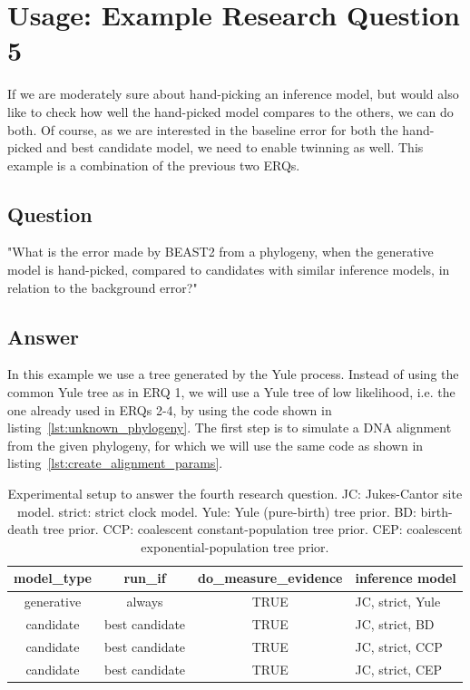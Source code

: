 \section{Usage: Example Research Question 5}

If we are moderately sure about hand-picking an inference model,
but would also like to check how well the hand-picked model compares
to the others, we can do both. Of course, as we are interested in the
baseline error for both the hand-picked and best candidate model,
we need to enable twinning as well. This example is a combination
of the previous two ERQs. 

\subsection{Question}

"What is the error made by BEAST2 from a phylogeny, 
when the generative model is hand-picked, 
compared to candidates with similar inference models, 
in relation to the background error?"

\subsection{Answer}

In this example we use a tree generated by the Yule process.
Instead of using the common Yule tree as in ERQ 1, we will use
a Yule tree of low likelihood, 
i.e. the one already used in ERQs 2-4, 
by using the code shown in listing~\ref{lst:unknown_phylogeny}.
The first step is to simulate a DNA alignment 
from the given phylogeny, for which we will use the same code 
as shown in listing~\ref{lst:create_alignment_params}.

\begin{table}
  \begin{tabular}{ | c | c | c | l | }
    \hline
    \textbf{model\_type} & 
    \textbf{run\_if} & 
    \textbf{do\_measure\_evidence} & 
    \textbf{inference model} \\ 
    \hline
    generative & always         & TRUE & JC, strict, Yule \\
    candidate  & best candidate & TRUE & JC, strict, BD \\
    candidate  & best candidate & TRUE & JC, strict, CCP \\
    candidate  & best candidate & TRUE & JC, strict, CEP \\
    \hline
  \end{tabular}
  \caption{
    Experimental setup to answer the fourth research question.
    JC: Jukes-Cantor site model.
    strict: strict clock model.
    Yule: Yule (pure-birth) tree prior.
    BD: birth-death tree prior.
    CCP: coalescent constant-population tree prior.
    CEP: coalescent exponential-population tree prior.
  }
  \label{tab:experiment_5}
\end{table}

